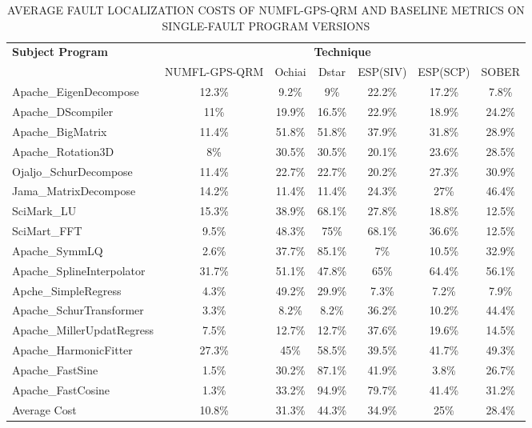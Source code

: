 \begin{table}[htbp!]
\fontsize{8pt}{9pt}\selectfont
\centering
\caption{AVERAGE FAULT LOCALIZATION COSTS OF NUMFL-GPS-QRM AND BASELINE METRICS ON SINGLE-FAULT PROGRAM VERSIONS}
\label{table2}
      \begin{tabular}{|l|c|c|c|c|c|c|}
      \hline
\multirow{2}{*}{{\bf Subject Program}}	&	\multicolumn{6}{|c|}{{\bf Technique}}	\\	\cline{2-7}
&{NUMFL-GPS-QRM}	&{ Ochiai}&	{ Dstar}&	{ ESP(SIV)} &	{ ESP(SCP)}	&{SOBER} \\\hline
Apache\_EigenDecompose	&	12.3\%	&	9.2\%	&	9\%	&	22.2\%	&	17.2\%	&	7.8\%	\\	\hline
Apache\_DScompiler	&	11\%	&	19.9\%	&	16.5\%	&	22.9\%	&	18.9\%	&	24.2\%	\\	\hline
Apache\_BigMatrix	&	11.4\%	&	51.8\%	&	51.8\%	&	37.9\%	&	31.8\%	&	28.9\%	\\	\hline
Apache\_Rotation3D	&	8\%	&	30.5\%	&	30.5\%	&	20.1\%	&	23.6\%	&	28.5\%	\\	\hline
Ojaljo\_SchurDecompose	&	11.4\%	&	22.7\%	&	22.7\%	&	20.2\%	&	27.3\%	&	30.9\%	\\	\hline
Jama\_MatrixDecompose	&	14.2\%	&	11.4\%	&	11.4\%	&	24.3\%	&	27\%	&	46.4\%	\\	\hline
SciMark\_LU	&	15.3\%	&	38.9\%	&	68.1\%	&	27.8\%	&	18.8\%	&	12.5\%	\\	\hline
SciMart\_FFT	&	9.5\%	&	48.3\%	&	75\%	&	68.1\%	&	36.6\%	&	12.5\%	\\	\hline
Apache\_SymmLQ	&	2.6\%	&	37.7\%	&	85.1\%	&	7\%	&	10.5\%	&	32.9\%	\\	\hline
Apache\_SplineInterpolator	&	31.7\%	&	51.1\%	&	47.8\%	&	65\%	&	64.4\%	&	56.1\%	\\	\hline
Apche\_SimpleRegress	&	4.3\%	&	49.2\%	&	29.9\%	&	7.3\%	&	7.2\%	&	7.9\%	\\	\hline
Apache\_SchurTransformer	&	3.3\%	&	8.2\%	&	8.2\%	&	36.2\%	&	10.2\%	&	44.4\%	\\	\hline
Apache\_MillerUpdatRegress	&	7.5\%	&	12.7\%	&	12.7\%	&	37.6\%	&	19.6\%	&	14.5\%	\\	\hline
Apache\_HarmonicFitter	&	27.3\%	&	45\%	&	58.5\%	&	39.5\%	&	41.7\%	&	49.3\%	\\	\hline
Apache\_FastSine	&	1.5\%	&	30.2\%	&	87.1\%	&	41.9\%	&	3.8\%	&	26.7\%	\\	\hline
Apache\_FastCosine	&	1.3\%	&	33.2\%	&	94.9\%	&	79.7\%	&	41.4\%	&	31.2\%	\\	\hline
Average Cost	&	10.8\%	&	31.3\%	&	44.3\%	&	34.9\%	&	25\%	&	28.4\%	\\	\hline
\end{tabular}
\end{table}


